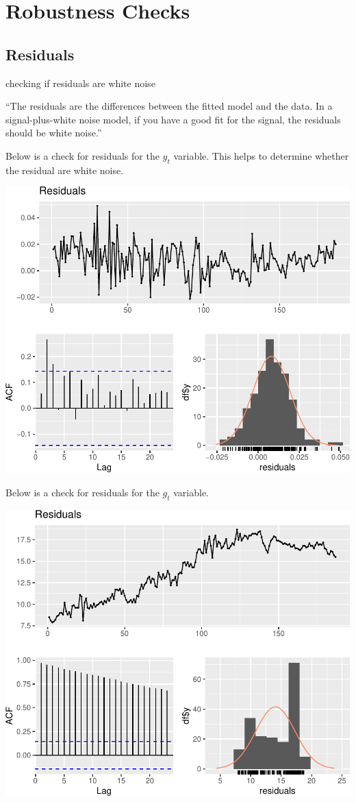 \documentclass[11pt,preprint, authoryear]{elsarticle}
\numberwithin{equation}{section}
\numberwithin{figure}{section}
\numberwithin{table}{section}
\begin{document}
\hypertarget{robustness-checks}{%
\section{Robustness Checks}\label{robustness-checks}}

\hypertarget{residuals}{%
\subsection{Residuals}\label{residuals}}

checking if residuals are white noise

``The residuals are the differences between the fitted model and the
data. In a signal-plus-white noise model, if you have a good fit for the
signal, the residuals should be white noise.''

Below is a check for residuals for the \(y_t\) variable. This helps to
determine whether the residual are white noise.

\includegraphics{TS_proj_files/figure-latex/unnamed-chunk-22-1.pdf}

Below is a check for residuals for the \(g_t\) variable.

\includegraphics{TS_proj_files/figure-latex/unnamed-chunk-23-1.pdf}
\end{document}
